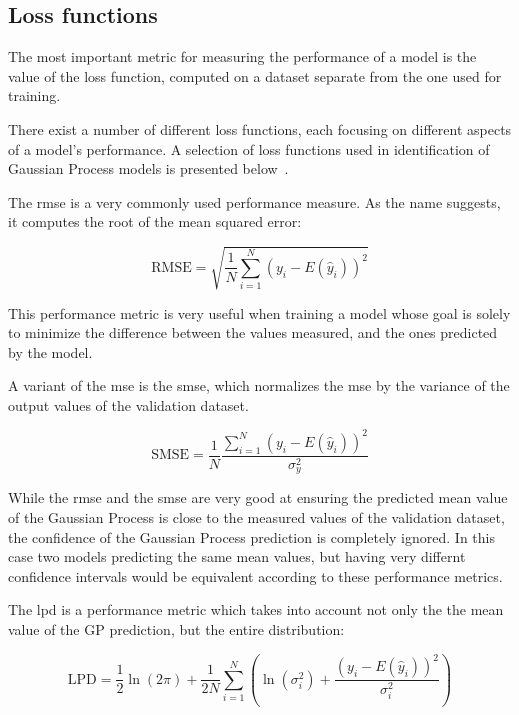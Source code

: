 \subsection{Loss functions}

The most important metric for measuring the performance of a model is the value
of the loss function, computed on a dataset separate from the one used for
training.

There exist a number of different loss functions, each focusing on different
aspects of a model's performance. A selection of loss functions used in
identification of Gaussian Process models is presented
below~\cite{kocijanModellingControlDynamic2016}.

The \acrfull{rmse} is a very commonly used performance measure. As the name
suggests, it computes the root of the mean squared error:

\begin{equation}\label{eq:rmse}
    \text{RMSE} = \sqrt{\frac{1}{N}\sum_{i=1}^N \left(y_i -
    E(\hat{y}_i)\right)^{2}}
\end{equation}

This performance metric is very useful when training a model whose goal is
solely to minimize the difference between the values measured, and the ones
predicted by the model.

A variant of the \acrshort{mse} is the \acrfull{smse}, which normalizes the
\acrlong{mse} by the variance of the output values of the validation dataset.

\begin{equation}\label{eq:smse}
    \text{SMSE} = \frac{1}{N}\frac{\sum_{i=1}^N \left(y_i -
    E(\hat{y}_i)\right)^{2}}{\sigma_y^2}
\end{equation}

While the \acrshort{rmse} and the \acrshort{smse} are very good at ensuring the
predicted mean value of the Gaussian Process is close to the measured values of
the validation dataset, the confidence of the Gaussian Process prediction is
completely ignored. In this case two models predicting the same mean values, but
having very differnt confidence intervals would be equivalent according to these
performance metrics.

The \acrfull{lpd} is a performance metric which takes into account not only the
the mean value of the GP prediction, but the entire distribution:

\begin{equation}
    \text{LPD} = \frac{1}{2} \ln{\left(2\pi\right)} + \frac{1}{2N}
    \sum_{i=1}^N\left(\ln{\left(\sigma_i^2\right)} + \frac{\left(y_i -
    E(\hat{y}_i)\right)^{2}}{\sigma_i^2}\right)
\end{equation}

